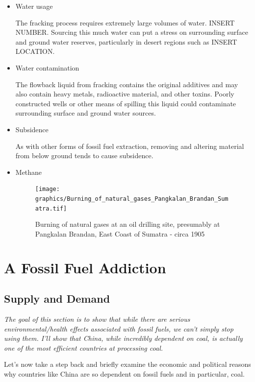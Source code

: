 \begin{itemize}
\item Water usage 

The fracking process requires extremely large volumes of water. INSERT NUMBER. Sourcing this much water can put a stress on surrounding surface and ground water reserves, particularly in desert regions such as INSERT LOCATION.

\item Water contamination 

The flowback liquid from fracking contains the original additives and may also contain heavy metals, radioactive material, and other toxins. Poorly constructed wells or other means of spilling this liquid could contaminate surrounding surface and ground water sources. 



\item Subsidence

As with other forms of fossil fuel extraction, removing and altering material from below ground tends to cause subsidence.

\item Methane

\begin{figure}[h]
	\centering
		\texttt{[image: graphics/Burning\_of\_natural\_gases\_Pangkalan\_Brandan\_Sumatra.tif]}
	\caption{Burning of natural gases at an oil drilling site, presumably at Pangkalan Brandan, East Coast of Sumatra - circa 1905}
	\label{fig:Burning_of_natural_gases_Pangkalan_Brandan_Sumatra}
\end{figure}


\end{itemize}


\section{A Fossil Fuel Addiction}


\subsection{Supply and Demand}

\emph{The goal of this section is to show that while there are serious environmental/health effects associated with fossil fuels, we can't simply stop using them. I'll show that China, while incredibly dependent on coal, is actually one of the most efficient countries at processing coal. }

Let's now take a step back and briefly examine the economic and political reasons why countries like China are so dependent on fossil fuels and in particular, coal.  

